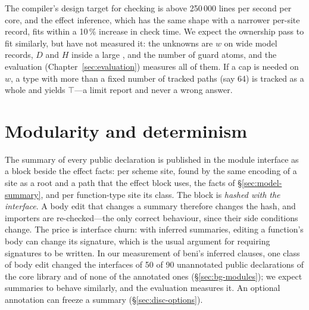 The compiler's design target for checking is above 250\,000 lines per second per core, and the effect
inference, which has the same shape with a narrower per-site record, fits within a 10\,\% increase in
check time. We expect the ownership pass to fit similarly, but have not measured it: the unknowns are
$w$ on wide model records, $D$ and $H$ inside a large , and the number of guard atoms, and
the evaluation (Chapter~\ref{sec:evaluation}) measures all of them. If a cap is needed on $w$, a type
with more than a fixed number of tracked paths (say 64) is tracked as a whole and yields $\top$---a limit
report and never a wrong answer.

\section{Modularity and determinism}
\label{sec:inf-modular}

The summary of every public declaration is published in the module interface as a block beside the
effect facts: per scheme site, found by the same encoding of a site as a root and a path that the effect
block uses, the facts of \S\ref{sec:model-summary}, and per function-type site its class. The block is
\emph{hashed with the interface}. A body edit that changes a summary therefore changes the hash, and
importers are re-checked---the only correct behaviour, since their side conditions change. The price is
interface churn: with inferred summaries, editing a function's body can change its signature, which is
the usual argument for requiring signatures to be written. In our measurement of beni's inferred
 clauses, one class of body edit changed the interfaces of 50 of 90 unannotated public
declarations of the core library and of none of the annotated ones (\S\ref{sec:bg-modules}); we expect
summaries to behave similarly, and the evaluation measures it. An optional annotation can freeze a
summary (\S\ref{sec:disc-options}).

